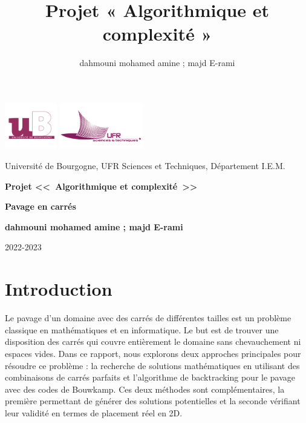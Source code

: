 \documentclass{article}
\title{Projet « Algorithmique et complexité »}
\author{dahmouni mohamed amine ; majd E-rami}
\begin{document}
\begin{titlepage}
\includegraphics[height=2cm]{image/logo-ub.png}
\hfill
\includegraphics[height=2cm]{image/logo-ufr.png}


\begin{center}
{\large{Université de Bourgogne, UFR Sciences et Techniques, Département I.E.M.}\par}

\vspace{2cm}
{\huge\bfseries Projet <<\ Algorithmique et complexité\ >>}\par
{\huge\bfseries Pavage en carrés}\par
{\bfseries dahmouni mohamed amine ; majd E-rami}\par

\end{center}
\tableofcontents

\vfill
{\hfill\large 2022-2023\par}

\end{titlepage}


\section{Introduction}

Le pavage d'un domaine avec des carrés de différentes tailles est un problème classique en mathématiques et en informatique. Le but est de trouver une disposition des carrés qui couvre entièrement le domaine sans chevauchement ni espaces vides. Dans ce rapport, nous explorons deux approches principales pour résoudre ce problème : la recherche de solutions mathématiques en utilisant des combinaisons de carrés parfaits et l'algorithme de backtracking pour le pavage avec des codes de Bouwkamp. Ces deux méthodes sont complémentaires, la première permettant de générer des solutions potentielles et la seconde vérifiant leur validité en termes de placement réel en 2D.
\end{document}
